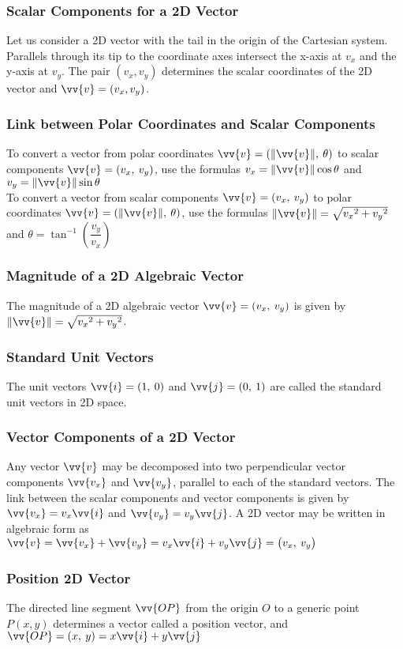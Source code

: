 \documentclass{article}
\begin{document}
	\subsubsection{Scalar Components for a 2D Vector}
	Let us consider a 2D vector with the tail in the origin of the Cartesian system. Parallels through its tip to the coordinate axes intersect the x-axis at $v_x$ and the y-axis at $v_y$.
	The pair $(v_x, v_y)$ determines the scalar coordinates of the 2D vector and $\vv{v}=(v_x, v_y)$.
	\subsubsection{Link between Polar Coordinates and Scalar Components}
	To convert a vector from polar coordinates $\vv{v}=(\lVert\vv{v}\rVert,\:\theta)$ to scalar components $\vv{v}=(v_x,\:v_y)$, use the formulas $v_x=\lVert\vv{v}\rVert\cos\theta$ and $v_y=\lVert\vv{v}\rVert\sin\theta$\\
	To convert a vector from scalar components $\vv{v}=(v_x,\:v_y)$ to polar coordinates $\vv{v}=(\lVert\vv{v}\rVert,\:\theta)$, use the formulas $\lVert\vv{v}\rVert=\sqrt{{v_x}^2+{v_y}^2}$ and $\theta=\tan^{-1}\left(\dfrac{v_y}{v_x}\right)$
	\subsubsection{Magnitude of a 2D Algebraic Vector}
	The magnitude of a 2D algebraic vector $\vv{v}=(v_x,\:v_y)$ is given by $\lVert\vv{v}\rVert=\sqrt{{v_x}^2+{v_y}^2}$.
	\subsubsection{Standard Unit Vectors}
	The unit vectors $\vv{i}=(1,\:0)$ and $\vv{j}=(0,\:1)$ are called the standard unit vectors in 2D space.
	\subsubsection{Vector Components of a 2D Vector}
	Any vector $\vv{v}$ may be decomposed into two perpendicular vector components $\vv{v_x}$ and $\vv{v_y}$, parallel to each of the standard vectors. %
	The link between the scalar components and vector components is given by $\vv{v_x}=v_x\vv{i}$ and $\vv{v_y}=v_y\vv{j}$. A 2D vector may be written in algebraic form as $\vv{v}=\vv{v_x}+\vv{v_y}=v_x\vv{i}+v_y\vv{j}=\left(v_x,\:v_y\right)$
	\subsubsection{Position 2D Vector}
	The directed line segment $\vv{OP}$ from the origin $O$ to a generic point $P(x, y)$ determines a vector called a position vector, and $\vv{OP}=(x,\:y)=x\vv{i}+y\vv{j}$
\end{document}

